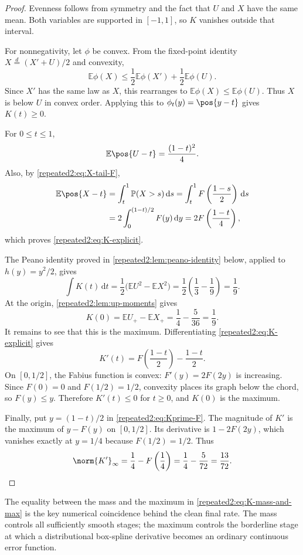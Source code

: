 \documentclass[11pt,oneside]{article}
\theoremstyle{definition}
\theoremstyle{remark}
\newcommand{\dd}{\,\mathrm d}
\newcommand{\E}{\mathbb E}
\newcommand{\Prob}{\mathbb P}
\begin{document}
\begin{proof}
Evenness follows from symmetry and the fact that $U$ and $X$ have the same mean.  Both
variables are supported in $[-1,1]$, so $K$ vanishes outside that interval.

For nonnegativity, let $\phi$ be convex.  From the fixed-point identity
$X\stackrel d=(X'+U)/2$ and convexity,
\[
 \E\phi(X)\le\frac12\E\phi(X')+\frac12\E\phi(U).
\]
Since $X'$ has the same law as $X$, this rearranges to
$\E\phi(X)\le\E\phi(U)$.  Thus $X$ is below $U$ in convex order.  Applying this to
$\phi_t(y)=\pos{y-t}$ gives $K(t)\ge0$.

For $0\le t\le1$,
\[
 \E\pos{U-t}=\frac{(1-t)^2}{4}.
\]
Also, by \eqref{repeated2:eq:X-tail-F},
\begin{align*}
 \E\pos{X-t}
 &=\int_t^1\Prob(X>s)\dd s
 =\int_t^1F\left(\frac{1-s}{2}\right)\dd s\\
 &=2\int_0^{(1-t)/2}F(y)\dd y
 =2F\left(\frac{1-t}{4}\right),
\end{align*}
which proves \eqref{repeated2:eq:K-explicit}.

The Peano identity proved in \cref{repeated2:lem:peano-identity} below, applied to
$h(y)=y^2/2$, gives
\[
 \int K(t)\dd t=\frac12\bigl(\E U^2-\E X^2\bigr)
 =\frac12\left(\frac13-\frac19\right)=\frac19.
\]
At the origin, \cref{repeated2:lem:up-moments} gives
\[
 K(0)=\E U_+-\E X_+=\frac14-\frac5{36}=\frac19.
\]
It remains to see that this is the maximum.  Differentiating
\eqref{repeated2:eq:K-explicit} gives
\begin{equation}
 K'(t)=F\left(\frac{1-t}{2}\right)-\frac{1-t}{2}.
 \label{repeated2:eq:Kprime-F}
\end{equation}
On $[0,1/2]$, the Fabius function is convex: $F'(y)=2F(2y)$ is increasing.  Since
$F(0)=0$ and $F(1/2)=1/2$, convexity places its graph below the chord, so
$F(y)\le y$.  Therefore $K'(t)\le0$ for $t\ge0$, and $K(0)$ is the maximum.

Finally, put $y=(1-t)/2$ in \eqref{repeated2:eq:Kprime-F}.  The magnitude of $K'$ is the maximum of
$y-F(y)$ on $[0,1/2]$.  Its derivative is $1-2F(2y)$, which vanishes exactly at
$y=1/4$ because $F(1/2)=1/2$.  Thus
\[
 \norm{K'}_\infty=\frac14-F\left(\frac14\right)
 =\frac14-\frac5{72}=\frac{13}{72}.
\]
\end{proof}

The equality between the mass and the maximum in \eqref{repeated2:eq:K-mass-and-max} is the key
numerical coincidence behind the clean final rate.  The mass controls all sufficiently
smooth stages; the maximum controls the borderline stage at which a distributional
box-spline derivative becomes an ordinary continuous error function.
\end{document}
